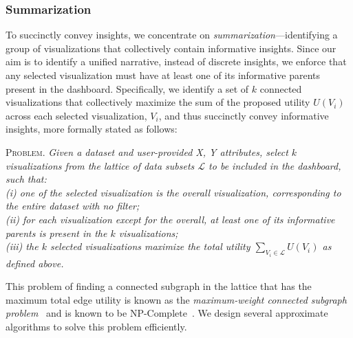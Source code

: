 \subsubsection{Summarization}
To succinctly convey insights, we concentrate on \emph{summarization}---identifying a group of visualizations that collectively contain informative insights. Since our aim is to identify a unified narrative, instead of discrete insights, we enforce that any selected visualization must have at least one of its informative parents present in the dashboard. Specifically, we identify a set of $k$ connected visualizations that collectively maximize the sum of the proposed utility $U(V_i)$ across each selected visualization, $V_i$, and thus succinctly convey informative insights, more formally stated as follows:
\par \textsc{Problem.} \textit{Given a dataset and user-provided X, Y attributes, select $k$ visualizations from the lattice of data subsets $\mathcal{L}$ to be included in the dashboard, such that:
\\ (i) one of the selected visualization is the overall visualization, corresponding to the entire dataset with no filter;
\\ (ii) for each visualization except for the overall, at least one of its informative parents is present in the $k$ visualizations;
\\ (iii) the $k$ selected visualizations maximize the total utility $\sum_{V_i \in \mathcal{L}} U(V_i)$ as defined above.
}%
\par This problem of finding a connected subgraph in the lattice that has the maximum total edge utility is known as the \emph{maximum-weight connected subgraph problem}~\cite{ErnstAlthaus2009} and is known to be NP-Complete~\cite{Parameswaran2010}. We design several approximate algorithms to solve this problem efficiently.
